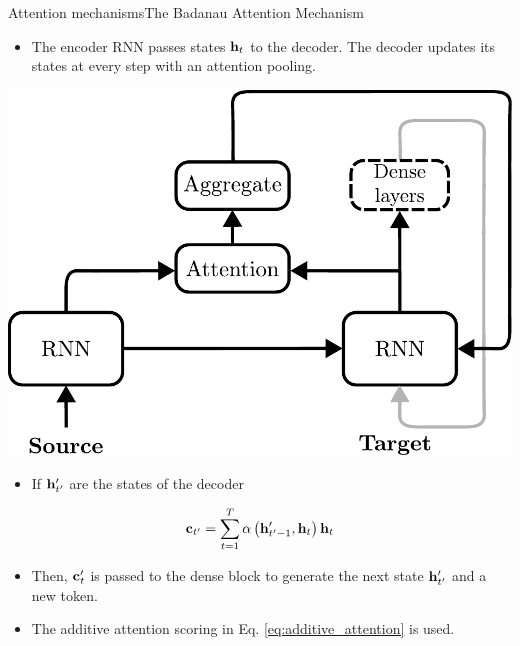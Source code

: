 \documentclass{beamer}
\begin{document}
\begin{frame}{Attention mechanisms}{The Badanau Attention Mechanism}
\begin{itemize}
    \item The encoder RNN passes states ${\bf h}_t$ to the decoder. The decoder updates its states at every step with an attention pooling.
\end{itemize}
\begin{multicols}{2}
    \begin{center}
        \includegraphics[scale=0.3]{Module 6 (Attention-based networks)/pics/sequence_translate_RNN_Bahdanau_compact.pdf}
    \end{center}
\columnbreak
\begin{itemize}
\item If ${\bf h}'_{t'}$ are the states of the decoder
\end{itemize}
\begin{equation}
    {\bf c}_{t'} = \sum_{t=1}^T \alpha\left({\bf h}'_{t'-1},{\bf h}_t  \right){\bf h}_t
\end{equation}
\begin{itemize}
    \item Then, ${\bf c}_t'$ is passed to the dense block to generate the next state ${\bf h}'_{t'}$ and a new token.
\end{itemize}
\end{multicols}
\begin{itemize}
\item The additive attention scoring in Eq. \eqref{eq:additive_attention} is used.
\end{itemize}
\end{frame}
\end{document}
